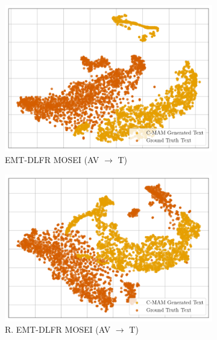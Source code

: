 \begin{figure}[!p]
\begin{subfigure}[b]{0.24\textwidth}
        \includegraphics[width=\textwidth]{imgs/tsne/emt_dlfr_baseline_mosei_tsne.png}
        \caption*{EMT-DLFR MOSEI (AV $\rightarrow$ T)}
    \end{subfigure}
    \begin{subfigure}[b]{0.24\textwidth}
        \centering
        \includegraphics[width=\textwidth]{imgs/tsne/emt_dlfr_robust_baseline_mosei_tsne.png}
        \caption*{R. EMT-DLFR MOSEI (AV $\rightarrow$ T)}
    \end{subfigure}
\\
    \centering
    \begin{subfigure}[b]{0.24\textwidth}
        \centering

\end{subfigure}
\end{figure}
